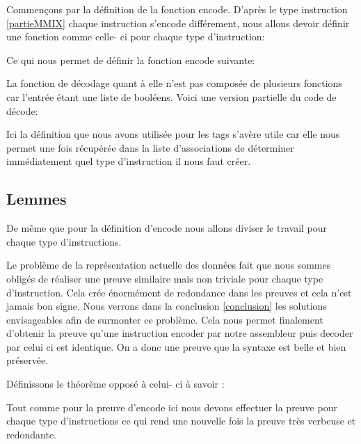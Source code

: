 \documentclass {article}
\newcommand{\codefrom}[3]
           {}
\theoremstyle{definition}
\theoremstyle{remark}
\begin{document}
Commençons par la définition de la fonction encode. D'après le type instruction \ref{partieMMIX}
chaque instruction s'encode différement, nous allons devoir définir une fonction comme celle- ci
pour chaque type d'instruction:

\codefrom{src}{encode}{encode_t_n}

Ce qui nous permet de définir la fonction encode suivante:

\codefrom{src}{encode}{encode}

La fonction de décodage quant à elle n'est pas composée de plusieurs fonctions car l'entrée
étant une liste de booléens.
Voici une version partielle du code de décode:

\codefrom{src}{encode}{decode}

Ici la définition que nous avons utilisée pour les tags s'avère utile car elle nous permet
une fois récupérée dans la liste d'associations de déterminer immédiatement quel type
d'instruction il nous faut créer.





\subsection{Lemmes}
\label{LemmesEncode}
De même que pour la définition d'encode nous allons diviser le travail pour chaque
type d'instructions.

\codefrom{src}{encodeProof}{encode_decode_t_n}

Le problème de la représentation actuelle des données fait que nous sommes obligés de réaliser une preuve
similaire mais non triviale pour chaque type d'instruction. Cela crée énormément de redondance dans les preuves
et cela n'est jamais bon signe. Nous verrons dans la conclusion \ref{conclusion} les solutions envisageables afin
de surmonter ce problème.
Cela nous permet finalement d'obtenir la preuve qu'une instruction encoder par notre assembleur puis decoder par celui
ci est identique. On a donc une preuve que la syntaxe est belle et bien préservée.

Définissons le théorème opposé à celui- ci à savoir :

\codefrom{src}{decodeProof}{decode_encode}

Tout comme pour la preuve d'encode ici nous devons effectuer la preuve pour chaque type d'instructions
ce qui rend une nouvelle fois la preuve très verbeuse et redondante. 
\end{document}
